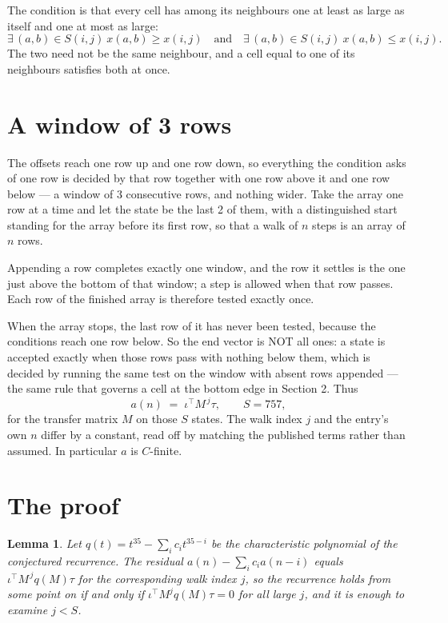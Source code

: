\documentclass[11pt,a4paper]{article}
\theoremstyle{plain}
\newtheorem{lemma}[theorem]{Lemma}
\theoremstyle{definition}
\begin{document}
The condition is that every cell has among its neighbours one at least as large as itself and one at most as large:
\[
\exists\,(a,b)\in S(i,j)\ x(a,b)\ge x(i,j)\quad\text{and}\quad\exists\,(a,b)\in S(i,j)\ x(a,b)\le x(i,j).
\]
The two need not be the same neighbour, and a cell equal to one of its neighbours satisfies both at once.

\section{A window of 3 rows}

The offsets reach one row up and one row down, so everything the condition asks of one row is
decided by that row together with one row above it and one row below --- a window of
$3$ consecutive rows, and nothing wider. Take the array one row at a time and
let the state be the last 2 of them, with a distinguished start standing for the array before its
first row, so that a walk of $n$ steps is an array of $n$ rows.

Appending a row completes exactly one window, and the row it settles is the one just above the bottom of that window; a step is
allowed when that row passes. Each row of the finished array is therefore tested exactly once.

When the array stops, the last row of it has never been tested, because the
conditions reach one row below. So the end vector is NOT all ones: a state is accepted exactly when
those rows pass with nothing below them, which is decided by running the same test on the window
with absent rows appended --- the same rule that governs a cell at the bottom edge in
Section 2.
Thus
\[
a(n)\;=\;\iota^{\!\top}M^{\,j}\tau ,\qquad S=757,
\]
for the transfer matrix $M$ on those $S$ states. The walk index $j$ and the entry's own $n$
differ by a constant, read off by matching the published terms rather than assumed. In
particular $a$ is $C$-finite.

\section{The proof}

\begin{lemma}\label{lem:crit}
Let $q(t)=t^{35}-\sum_i c_it^{35-i}$ be the characteristic polynomial of the
conjectured recurrence. The residual $a(n)-\sum_ic_ia(n-i)$ equals
$\iota^{\!\top}M^{\,j}q(M)\tau$ for the corresponding walk index $j$, so the recurrence
holds from some point on if and only if $\iota^{\!\top}M^{j}q(M)\tau=0$ for all large $j$,
and it is enough to examine $j<S$.
\end{lemma}
\end{document}
